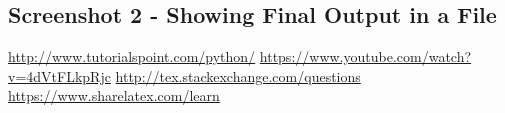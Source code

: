 \documentclass[a4paper,10pt]{article}
\begin{document}
\subsection{Screenshot 2 - Showing Final Output in a File}



\newpage %
\begin{thebibliography}{widestlabel} %
\bibitem{}\url{http://www.tutorialspoint.com/python/}          %
\bibitem{}\url{https://www.youtube.com/watch?v=4dVtFLkpRjc}
\bibitem{}\url{http://tex.stackexchange.com/questions}
\bibitem{}\url{https://www.sharelatex.com/learn}

\end{thebibliography} %
 
\end{document}
